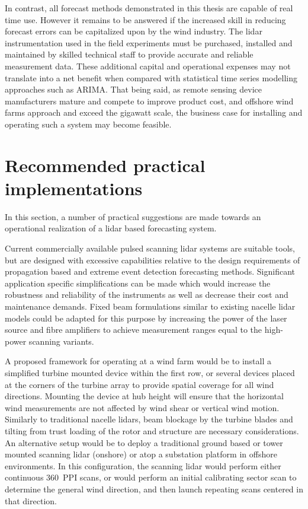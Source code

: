 In contrast, all forecast methods demonstrated in this thesis are capable of real time use. However it remains to be answered if the increased skill in reducing forecast errors can be capitalized upon by the wind industry. The lidar instrumentation used in the field experiments must be purchased, installed and maintained by skilled technical staff to provide accurate and reliable measurement data. These additional capital and operational expenses may not translate into a net benefit when compared with statistical time series modelling approaches such as ARIMA. That being said, as remote sensing device manufacturers mature and compete to improve product cost, and offshore wind farms approach and exceed the gigawatt scale, the business case for installing and operating such a system may become feasible.

\clearpage
\section{Recommended practical implementations}
\label{sec:discussion_practical}

In this section, a number of practical suggestions are made towards an operational realization of a lidar based forecasting system.

Current commercially available pulsed scanning lidar systems are suitable tools, but are designed with excessive capabilities relative to the design requirements of propagation based and extreme event detection forecasting methods. Significant application specific simplifications can be made which would increase the robustness and reliability of the instruments as well as decrease their cost and maintenance demands. Fixed beam formulations similar to existing nacelle lidar models could be adapted for this purpose by increasing the power of the laser source and fibre amplifiers to achieve measurement ranges equal to the high-power scanning variants. 

A proposed framework for operating at a wind farm would be to install a simplified turbine mounted device within the first row, or several devices placed at the corners of the turbine array to provide spatial coverage for all wind directions. Mounting the device at hub height will ensure that the horizontal wind measurements are not affected by wind shear or vertical wind motion. Similarly to traditional nacelle lidars, beam blockage by the turbine blades and tilting from trust loading of the rotor and structure are necessary considerations. An alternative setup would be to deploy a traditional ground based or tower mounted scanning lidar (onshore) or atop a substation platform in offshore environments. In this configuration, the scanning lidar would perform either continuous 360\degree \ PPI scans, or would perform an initial calibrating sector scan to determine the general wind direction, and then launch repeating scans centered in that direction. 

